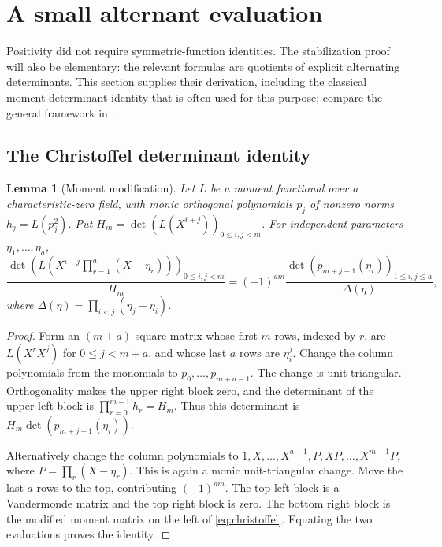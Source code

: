 \documentclass[11pt]{article}
\newtheorem{lemma}[theorem]{Lemma}
\theoremstyle{definition}
\theoremstyle{remark}
\newcommand{\Dlt}{\Delta}
\numberwithin{equation}{section}
\begin{document}
\section{A small alternant evaluation}
\label{sec:alternants}

Positivity did not require symmetric-function identities. The stabilization
proof will also be elementary: the relevant formulas are quotients of
explicit alternating determinants. This section supplies their derivation,
including the classical moment determinant identity that is often used for
this purpose; compare the general framework in \cite{CK}.

\subsection{The Christoffel determinant identity}
\begin{lemma}[Moment modification]
\label{lem:christoffel}
Let $L$ be a moment functional over a characteristic-zero field, with monic
orthogonal polynomials $p_j$ of nonzero norms $h_j=L(p_j^2)$.
Put $H_m=\det(L(X^{i+j}))_{0\le i,j<m}$.
For independent parameters $\eta_1,\ldots,\eta_a$,
\begin{equation}
 \frac{\det\left(L\left(X^{i+j}\prod_{r=1}^a(X-\eta_r)\right)\right)_{0\le i,j<m}}{H_m}
 =(-1)^{am}
 \frac{\det(p_{m+j-1}(\eta_i))_{1\le i,j\le a}}
 {\Dlt(\eta)},
 \label{eq:christoffel}
\end{equation}
where $\Dlt(\eta)=\prod_{i<j}(\eta_j-\eta_i)$.
\end{lemma}
\begin{proof}
Form an $(m+a)$-square matrix whose first $m$ rows, indexed by $r$, are
$L(X^r X^j)$ for $0\le j<m+a$, and whose last $a$ rows are
$\eta_i^j$. Change the column polynomials from the monomials to
$p_0,\ldots,p_{m+a-1}$. The change is unit triangular. Orthogonality makes
the upper right block zero, and the determinant of the upper left block is
$\prod_{r=0}^{m-1}h_r=H_m$. Thus this determinant is
$H_m\det(p_{m+j-1}(\eta_i))$.

Alternatively change the column polynomials to
$1,X,\ldots,X^{a-1},P,XP,\ldots,X^{m-1}P$, where
$P=\prod_r(X-\eta_r)$. This is again a monic unit-triangular change.
Move the last $a$ rows to the top, contributing $(-1)^{am}$.
The top left block is a Vandermonde matrix and the top right block is zero.
The bottom right block is the modified moment matrix on the left of
\eqref{eq:christoffel}. Equating the two evaluations proves the identity.
\end{proof}
\end{document}
